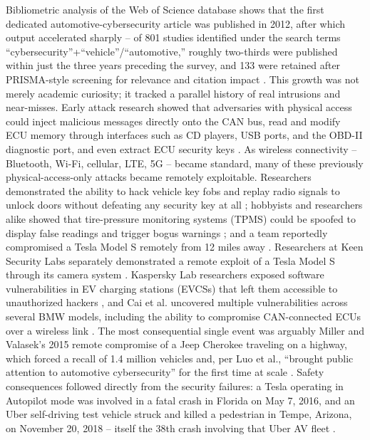 \documentclass[journal]{IEEEtran}
\begin{document}
	Bibliometric analysis of the Web of Science database shows that the
	first dedicated automotive-cybersecurity article was published in 2012,
	after which output accelerated sharply -- of 801 studies identified under
	the search terms ``cybersecurity''+``vehicle''/``automotive,'' roughly
	two-thirds were published within just the three years preceding the
	survey, and 133 were retained after PRISMA-style screening for relevance
	and citation impact \cite{ref3}. This growth was not merely academic
	curiosity; it tracked a parallel history of real intrusions and
	near-misses. Early attack research showed that adversaries with physical
	access could inject malicious messages directly onto the CAN bus, read
	and modify ECU memory through interfaces such as CD players, USB ports,
	and the OBD-II diagnostic port, and even extract ECU security keys
	\cite{ref4}. As wireless connectivity -- Bluetooth, Wi-Fi, cellular, LTE,
	5G -- became standard, many of these previously physical-access-only
	attacks became remotely exploitable. Researchers demonstrated the
	ability to hack vehicle key fobs and replay radio signals to unlock doors
	without defeating any security key at all \cite{ref4}; hobbyists and
	researchers alike showed that tire-pressure monitoring systems (TPMS)
	could be spoofed to display false readings and trigger bogus warnings
	\cite{ref4}; and a team reportedly compromised a Tesla Model S remotely
	from 12 miles away \cite{ref4}. Researchers at Keen Security Labs
	separately demonstrated a remote exploit of a Tesla Model S through its
	camera system \cite{ref2}. Kaspersky Lab researchers exposed software
	vulnerabilities in EV charging stations (EVCSs) that left them accessible
	to unauthorized hackers \cite{ref1}, and Cai et al. uncovered multiple
	vulnerabilities across several BMW models, including the ability to
	compromise CAN-connected ECUs over a wireless link \cite{ref4}. The most
	consequential single event was arguably Miller and Valasek's 2015 remote
	compromise of a Jeep Cherokee traveling on a highway, which forced a
	recall of 1.4 million vehicles and, per Luo et al., ``brought public
	attention to automotive cybersecurity'' for the first time at scale
	\cite{ref5}. Safety consequences followed directly from the security
	failures: a Tesla operating in Autopilot mode was involved in a fatal
	crash in Florida on May 7, 2016, and an Uber self-driving test vehicle
	struck and killed a pedestrian in Tempe, Arizona, on November 20, 2018 --
	itself the 38th crash involving that Uber AV fleet \cite{ref2}.
	
\end{document}
